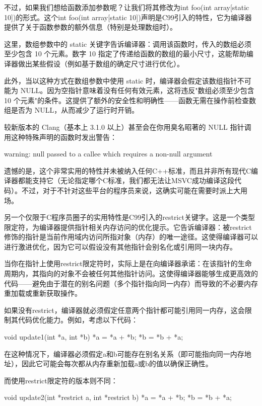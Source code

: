不过，如果我们想给函数添加参数呢？让我们将其修改为int foo(int array[static 10])的形式。这个int foo(int array[static 10])声明是C99引入的特性，它为编译器提供了关于函数参数的额外信息（特别是处理数组时）。

这里，数组参数中的 static 关键字告诉编译器：调用该函数时，传入的数组必须至少包含 10 个元素。数字 10 指定了传递给函数的数组的最小尺寸，这能帮助编译器做出某些假设（例如基于数组的确定尺寸进行优化）。

此外，当以这种方式在数组参数中使用 static 时，编译器会假定该数组指针不可能为 NULL。因为空指针意味着没有任何有效元素，这将违反"数组必须至少包含 10 个元素"的条件。这提供了额外的安全性和明确性——函数无需在操作前检查数组是否为 NULL，从而减少了运行时开销。

较新版本的 Clang（基本上 3.1.0 以上）甚至会在你用臭名昭著的 NULL 指针调用这种特殊声明的函数时发出警告：

\begin{shell}
warning: null passed to a callee which requires a non-null argument
\end{shell}

遗憾的是，这个非常实用的特性并未被纳入任何C++标准，而且并非所有现代C编译器都能支持它（无论指定哪个C标准，我们都无法让MSVC成功编译这段代码）。不过，对于不针对这些平台的程序员来说，这确实可能在需要时派上大用场。

另一个仅限于C程序员圈子的实用特性是C99引入的restrict关键字。这是一个类型限定符，为编译器提供指针相关内存访问的优化提示。它告诉编译器：被restrict修饰的指针是当前作用域内访问所指对象（内存）的唯一途径。这使得编译器可以进行激进优化，因为它可以假设没有其他指针会别名化或引用同一块内存。

当你在指针上使用restrict限定符时，实际上是在向编译器承诺：在该指针的生命周期内，其指向的对象不会被任何其他指针访问。这使得编译器能够生成更高效的代码——避免由于潜在的别名问题（多个指针指向同一内存）而导致的不必要内存重加载或重新获取操作。

如果没有restrict，编译器就必须假定任意两个指针都可能引用同一内存，这会限制其代码优化能力。例如，考虑以下代码：

\begin{cpp}
void update1(int *a, int *b) {
  *a = *a + *b;
  *b = *b + *a;
}
\end{cpp}

在这种情况下，编译器必须假定a和b可能存在别名关系（即可能指向同一内存地址），因此它可能会每次都从内存重新加载a或b的值以确保正确性。

而使用restrict限定符的版本则不同：

\begin{cpp}
void update2(int *restrict a, int *restrict b) {
  *a = *a + *b;
  *b = *b + *a;
}
\end{cpp}

